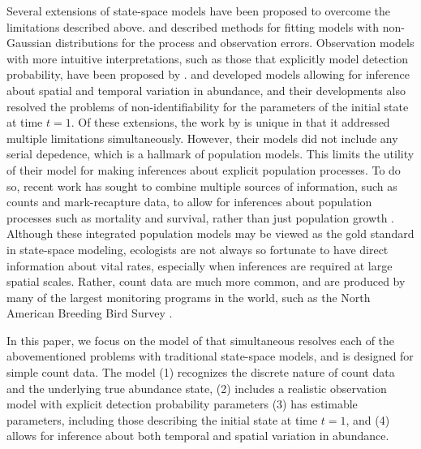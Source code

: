 \documentclass[12pt]{article}
\begin{document}
Several extensions of state-space models have been proposed to
overcome the limitations described
above. \citet{devalpine_hastings:2002} and \citet{kery_etal:2009}
described methods for fitting models with non-Gaussian distributions
for the process and observation errors. Observation models with more
intuitive interpretations, such as those that explicitly model
detection probability, have been proposed by
\citet{kery_etal:2009}. \citet{lele_etal:1998} and
\citep{kery_etal:2009} developed models allowing for inference about
spatial and temporal variation in abundance, and their developments
also resolved the problems of non-identifiability for the parameters
of the initial state at time $t=1$. Of these extensions, the work by
\citet{kery_etal:2009} is unique in that it addressed multiple limitations
simultaneously. However, their models did not include any serial
depedence, which is a hallmark of population models. This limits the
utility of their model for making inferences about explicit population
processes. To do so, recent work has sought to combine multiple
sources of information, such as counts and mark-recapture data, to
allow for inferences about population processes such as mortality and
survival, rather than just population growth \citep{besbeas_etal:2002,
  buckland_etal:2004, schaub_etal:2007}. Although these integrated
population models may be viewed as the gold standard in state-space
modeling, ecologists are not always so fortunate to have direct
information about vital rates, especially when inferences are required
at large spatial scales. Rather, count data are much more common, and
are produced by many of the largest monitoring programs in the world,
such as the North American Breeding Bird Survey
\citep[BBS;][]{robbins_etal:1986}.

In this paper, we focus on the model of
\citet{dail_madsen:2011} %
that simultaneous resolves each of the abovementioned problems with
traditional state-space models, and is designed for simple count
data. The model (1) recognizes
the discrete nature of count data and the underlying true abundance
state, (2) includes a realistic observation model with explicit
detection probability parameters (3) has estimable parameters,
including those describing the initial state at time $t=1$, and (4)
allows for inference about both temporal and spatial variation in
abundance.

\end{document}
